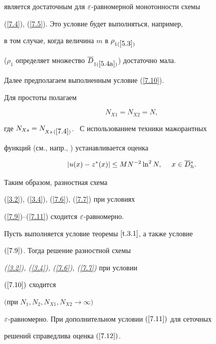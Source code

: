 является достаточным для $\varepsilon$-равномерной монотонности схемы


(\ref{7.4}), (\ref{7.5}). Это условие будет выполняться, например,


в том случае, когда величина $m$ в $\rho_{1(\ref{5.3})}$


($\rho_1$ определяет множество $\overline{D}_{1(\ref{5.4a})}$) достаточно мала.


Далее предполагаем выполненным условие (\ref{7.10}).





Для простоты полагаем


\begin{equation} \label{7.11}


N_{X1}=N_{X2}=N,


\end{equation}


где $N_{Xs}=N_{Xs\,(\ref{7.4})}$. \ С использованием техники мажорантных


функций (см., напр., \cite{1}) устанавливается оценка


\begin{equation} \label{7.12}


|u(x)-z^*(x)|\le MN^{-2}\ln^2 N, \quad \ x\in \Db{}_h^{*}.


\end{equation}


Таким образом, разностная схема


(\ref{3.2}), (\ref{3.4}), (\ref{7.6}), (\ref{7.7}) при условиях


(\ref{7.9})--(\ref{7.11}) сходится $\varepsilon$-равномерно.





\begin{thms} \label{t.7.1}


Пусть выполняется условие теоремы $\ref{t.3.1}$, а также условие


$(\ref{7.9})$. Тогда решение разностной схемы


{\em (\ref{3.2}), (\ref{3.4}), (\ref{7.6}), (\ref{7.7})} при условии


$(\ref{7.10})$ сходится


$($при $N_1, N_2, N_{X1}, N_{X2} \to\infty)$


$\varepsilon$-равномерно. При дополнительном условии $(\ref{7.11})$ для сеточных


решений справедлива оценка $(\ref{7.12})$.


\end{thms}





